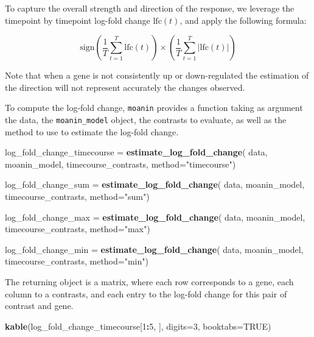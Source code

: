 \documentclass[9pt,a4paper,]{extarticle}
\newenvironment{Shaded}{\begin{snugshade}}{\end{snugshade}}
\newcommand{\DataTypeTok}[1]{\textcolor[rgb]{0.13,0.29,0.53}{#1}}
\newcommand{\DecValTok}[1]{\textcolor[rgb]{0.00,0.00,0.81}{#1}}
\newcommand{\KeywordTok}[1]{\textcolor[rgb]{0.13,0.29,0.53}{\textbf{#1}}}
\newcommand{\NormalTok}[1]{#1}
\newcommand{\OperatorTok}[1]{\textcolor[rgb]{0.81,0.36,0.00}{\textbf{#1}}}
\newcommand{\OtherTok}[1]{\textcolor[rgb]{0.56,0.35,0.01}{#1}}
\newcommand{\StringTok}[1]{\textcolor[rgb]{0.31,0.60,0.02}{#1}}
\begin{document}
To capture the overall strength and direction of the response, we leverage the
timepoint by timepoint log-fold change \(\text{lfc}(t)\), and apply the
following formula:

\[\text{sign}\left(\frac{1}{T}\sum_{t = 1}^T \text{lfc}(t) \right) \times \left(\frac{1}{T}\sum_{t= 1}^T \lvert {\text{lfc}(t)} \lvert \right)\]

Note that when a gene is not consistently up or down-regulated the estimation
of the direction will not represent accurately the changes observed.

To compute the log-fold change, \texttt{moanin} provides a function taking as
argument the data, the \texttt{moanin\_model} object, the contrasts to evaluate, as
well as the method to use to estimate the log-fold change.

\begin{Shaded}
\begin{Highlighting}[]
\NormalTok{log_fold_change_timecourse =}\StringTok{ }\KeywordTok{estimate_log_fold_change}\NormalTok{(}
\NormalTok{    data, moanin_model, timecourse_contrasts,  }\DataTypeTok{method=}\StringTok{"timecourse"}\NormalTok{)}

\NormalTok{log_fold_change_sum =}\StringTok{ }\KeywordTok{estimate_log_fold_change}\NormalTok{(}
\NormalTok{    data, moanin_model, timecourse_contrasts,  }\DataTypeTok{method=}\StringTok{"sum"}\NormalTok{)}

\NormalTok{log_fold_change_max =}\StringTok{ }\KeywordTok{estimate_log_fold_change}\NormalTok{(}
\NormalTok{    data, moanin_model, timecourse_contrasts, }\DataTypeTok{method=}\StringTok{"max"}\NormalTok{)}

\NormalTok{log_fold_change_min =}\StringTok{ }\KeywordTok{estimate_log_fold_change}\NormalTok{(}
\NormalTok{    data, moanin_model, timecourse_contrasts, }\DataTypeTok{method=}\StringTok{"min"}\NormalTok{)}
\end{Highlighting}
\end{Shaded}

The returning object is a matrix, where each row corresponds to a gene,
each column to a contrasts, and each entry to the log-fold change for this
pair of contrast and gene.

\begin{Shaded}
\begin{Highlighting}[]
\KeywordTok{kable}\NormalTok{(log_fold_change_timecourse[}\DecValTok{1}\OperatorTok{:}\DecValTok{5}\NormalTok{, ], }\DataTypeTok{digits=}\DecValTok{3}\NormalTok{, }\DataTypeTok{booktabs=}\OtherTok{TRUE}\NormalTok{)}
\end{Highlighting}
\end{Shaded}
\end{document}
